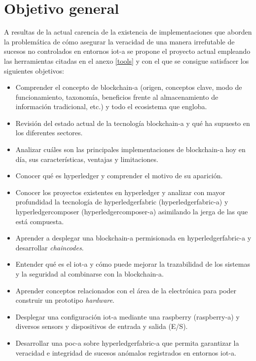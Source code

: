 \documentclass[12pt,a4paper, twoside]{report}
\begin{document}
	\section{Objetivo general}

	A resultas de la actual carencia de la existencia de implementaciones que aborden la problemática de cómo asegurar la veracidad de una manera irrefutable de sucesos no controlados en entornos \gls{iot-a} se propone el proyecto actual empleando las herramientas citadas en el anexo \ref{tools} y con el que se consigue satisfacer los siguientes objetivos:
		
	\begin{itemize}
		\item Comprender el concepto de \gls{blockchain-a} (origen, conceptos clave, modo de funcionamiento, taxonomía, beneficios frente al almacenamiento de información tradicional, etc.) y todo el ecosistema que engloba. 
		\item Revisión del estado actual de la tecnología \gls{blockchain-a} y qué ha supuesto en los diferentes sectores.
		\item Analizar cuáles son las principales implementaciones de \gls{blockchain-a} hoy en día, sus características, ventajas y limitaciones.
		\item Conocer qué es \gls{hyperledger} y comprender el motivo de su aparición. 
		\item Conocer los proyectos existentes en \gls{hyperledger} y analizar con mayor profundidad la tecnología de \gls{hyperledgerfabric} (\gls{hyperledgerfabric-a}) y \gls{hyperledgercomposer} (\gls{hyperledgercomposer-a}) \cite{hyperledgercomposer:url} asimilando la jerga de las que está compuesta. 
		\item Aprender a desplegar una \gls{blockchain-a} permisionada en \gls{hyperledgerfabric-a} y desarrollar \textit{\glspl{chaincode}}.
		\item Entender qué es el \gls{iot-a} y cómo puede mejorar la trazabilidad de los sistemas y la seguridad al combinarse con la \gls{blockchain-a}.
		\item Aprender conceptos relacionados con el área de la electrónica para poder construir un \gls{prototipo} \textit{hardware}.
		\item Desplegar una configuración \gls{iot-a} mediante una \gls{raspberry} (\gls{raspberry-a}) y diversos \glspl{sensor} y dispositivos de entrada y salida (E/S).
		\item Desarrollar una \gls{poc-a} sobre \gls{hyperledgerfabric-a} que permita garantizar la veracidad e integridad de sucesos anómalos registrados en entornos \gls{iot-a}.
	\end{itemize}
		
\end{document}
